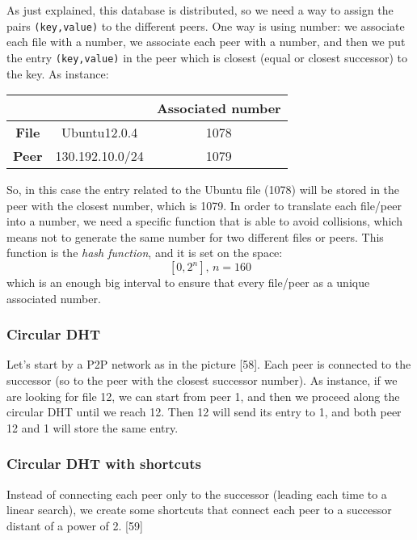 As just explained, this database is distributed, so we need a way to assign the pairs \texttt{(key,value)} to the different peers. One way is using number: we associate each file with a number, we associate each peer with a number, and then we put the entry \texttt{(key,value)} in the peer which is closest (equal or closest successor) to the key. As instance:
\begin{table}[h!]
    \centering
    \begin{tabular}{cc|c|}
    \cline{3-3}
    \multicolumn{1}{l}{} & \multicolumn{1}{l|}{} & \multicolumn{1}{l|}{Associated number} \\ \hline
    \multicolumn{1}{|c|}{\textbf{File}} & Ubuntu12.0.4 & 1078 \\ \hline
    \multicolumn{1}{|c|}{\textbf{Peer}} & 130.192.10.0/24 & 1079 \\ \hline
    \end{tabular}
\end{table}

\noindent So, in this case the entry related to the Ubuntu file (1078) will be stored in the peer with the closest number, which is 1079. In order to translate each file/peer into a number, we need a specific function that is able to avoid collisions, which means not to generate the same number for two different files or peers. This function is the \textit{hash function}, and it is set on the space:
\[[0,2^n]\text{, }n=160\]
\noindent which is an enough big interval to ensure that every file/peer as a unique associated number.

\subsubsection{Circular DHT}
Let's start by a P2P network as in the picture [58]. Each peer is connected to the successor (so to the peer with the closest successor number). As instance, if we are looking for file 12, we can start from peer 1, and then we proceed along the circular DHT until we reach 12. Then 12 will send its entry to 1, and both peer 12 and 1 will store the same entry.

\subsubsection{Circular DHT with shortcuts}
Instead of connecting each peer only to the successor (leading each time to a linear search), we create some shortcuts that connect each peer to a successor distant of a power of 2. [59]


